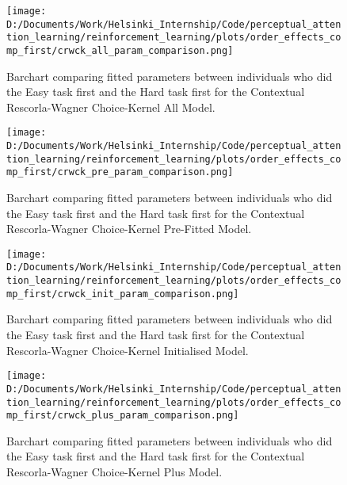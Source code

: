 \documentclass[12pt]{article}
\newcommand{\scale}{0.4}
\begin{document}
\begin{figure}[h]  %
	\centering
	\texttt{[image: D:/Documents/Work/Helsinki\_Internship/Code/perceptual\_attention\_learning/reinforcement\_learning/plots/order\_effects\_comp\_first/crwck\_all\_param\_comparison.png]}  %
	\caption{Barchart comparing fitted parameters between individuals who did the Easy task first and the Hard task first for the Contextual Rescorla-Wagner Choice-Kernel All Model.}
	\label{fig:crwck_all_model_effects}
\end{figure} 

\begin{figure}[h]  %
	\centering
	\texttt{[image: D:/Documents/Work/Helsinki\_Internship/Code/perceptual\_attention\_learning/reinforcement\_learning/plots/order\_effects\_comp\_first/crwck\_pre\_param\_comparison.png]}  %
	\caption{Barchart comparing fitted parameters between individuals who did the Easy task first and the Hard task first for the Contextual Rescorla-Wagner Choice-Kernel Pre-Fitted Model.}
	\label{fig:crwck_pre_model_effects}
\end{figure} 


\begin{figure}[h]  %
	\centering
	\texttt{[image: D:/Documents/Work/Helsinki\_Internship/Code/perceptual\_attention\_learning/reinforcement\_learning/plots/order\_effects\_comp\_first/crwck\_init\_param\_comparison.png]}  %
	\caption{Barchart comparing fitted parameters between individuals who did the Easy task first and the Hard task first for the Contextual Rescorla-Wagner Choice-Kernel Initialised Model.}
	\label{fig:crwck_init_model_effects}
\end{figure} 

\begin{figure}[h]  %
	\centering
	\texttt{[image: D:/Documents/Work/Helsinki\_Internship/Code/perceptual\_attention\_learning/reinforcement\_learning/plots/order\_effects\_comp\_first/crwck\_plus\_param\_comparison.png]}  %
	\caption{Barchart comparing fitted parameters between individuals who did the Easy task first and the Hard task first for the Contextual Rescorla-Wagner Choice-Kernel Plus Model.}
	\label{fig:crwck_plus_model_effects}
\end{figure} 
\end{document}
